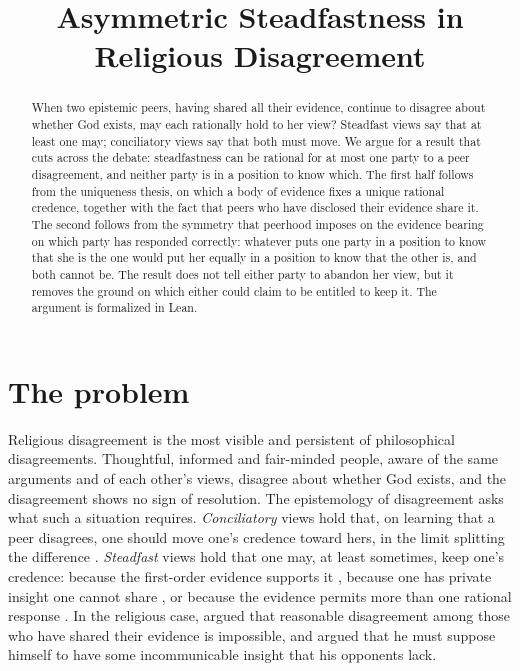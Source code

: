 \documentclass{situationist-preprint}
\title{Asymmetric Steadfastness in Religious Disagreement}
\begin{document}
\maketitle

\begin{abstract}
When two epistemic peers, having shared all their evidence, continue to disagree about whether God exists, may each rationally hold to her view? Steadfast views say that at least one may; conciliatory views say that both must move. We argue for a result that cuts across the debate: steadfastness can be rational for at most one party to a peer disagreement, and neither party is in a position to know which. The first half follows from the uniqueness thesis, on which a body of evidence fixes a unique rational credence, together with the fact that peers who have disclosed their evidence share it. The second follows from the symmetry that peerhood imposes on the evidence bearing on which party has responded correctly: whatever puts one party in a position to know that she is the one would put her equally in a position to know that the other is, and both cannot be. The result does not tell either party to abandon her view, but it removes the ground on which either could claim to be entitled to keep it. The argument is formalized in Lean.
\end{abstract}

\section{The problem}

Religious disagreement is the most visible and persistent of philosophical disagreements. Thoughtful, informed and fair-minded people, aware of the same arguments and of each other's views, disagree about whether God exists, and the disagreement shows no sign of resolution. The epistemology of disagreement asks what such a situation requires. \emph{Conciliatory} views hold that, on learning that a peer disagrees, one should move one's credence toward hers, in the limit splitting the difference \citep{Elga2007,Christensen2007,Feldman2007}. \emph{Steadfast} views hold that one may, at least sometimes, keep one's credence: because the first-order evidence supports it \citep{Kelly2005}, because one has private insight one cannot share \citep{vanInwagen1996}, or because the evidence permits more than one rational response \citep{Rosen2001}. In the religious case, \citet{Feldman2007} argued that reasonable disagreement among those who have shared their evidence is impossible, and \citet{vanInwagen1996} argued that he must suppose himself to have some incommunicable insight that his opponents lack.
\end{document}

